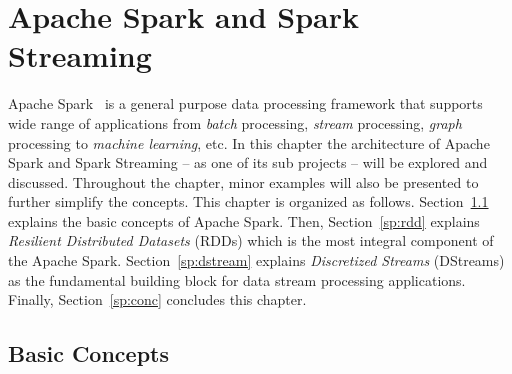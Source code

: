 \chapter{Apache Spark and Spark Streaming}
\label{spark}
Apache Spark~\cite{spark} is a general purpose data processing framework that supports wide range of applications from \emph{batch} processing, \emph{stream} processing, \emph{graph} processing to \emph{machine learning}, etc. In this chapter the architecture of Apache Spark and Spark Streaming -- as one of its sub projects -- will be explored and discussed. Throughout the chapter, minor examples will also be presented to further simplify the concepts. This chapter is organized as follows. Section~\ref{sp:basics} explains the basic concepts of Apache Spark. Then, Section~\ref{sp:rdd} explains \emph{Resilient Distributed Datasets} (RDDs) which is the most integral component of the Apache Spark. Section~\ref{sp:dstream} explains \emph{Discretized Streams} (DStreams) as the fundamental building block for data stream processing applications. Finally, Section~\ref{sp:conc} concludes this chapter.

\section{Basic Concepts}
\label{sp:basics}


